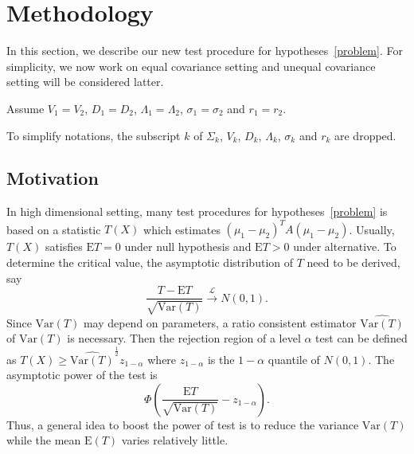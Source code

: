 
\section{Methodology}

In this section, we describe our new test procedure for hypotheses~\eqref{problem}. For simplicity, we now work on equal covariance setting and unequal covariance setting will be considered latter.
\begin{assumption}\label{theModel2}
Assume $V_1=V_2$, $D_1=D_2$, $\Lambda_1=\Lambda_2$, $\sigma_1=\sigma_2$ and $r_1=r_2$.
\end{assumption}

To simplify notations, the subscript $k$ of $\Sigma_k$, $V_k$, $D_k$, $\Lambda_k$, $\sigma_k$ and $r_k$ are dropped.

\subsection{Motivation}
 In high dimensional setting, many test procedures for hypotheses~\eqref{problem} is based on a statistic $T(X)$ which estimates ${(\mu_1-\mu_2)}^T A(\mu_1-\mu_2)$.
 Usually, $T(X)$ satisfies $\mathrm{E}T=0$ under null hypothesis and $\mathrm{E}T> 0$  under alternative.
 To determine the critical value, the asymptotic distribution of $T$ need to be derived, say 
 $$\frac{T-\textrm{E}T}{\sqrt{\textrm{Var}(T)}}\xrightarrow{\mathcal{L}} N(0,1).$$
 Since $\textrm{Var}(T)$ may depend on parameters, a ratio consistent estimator $\widehat{\textrm{Var}(T)}$ of $\textrm{Var}(T)$ is necessary. Then
 the rejection region of a level $\alpha$ test can be defined as $T(X)\geq \widehat{\textrm{Var}(T)}^{\frac{1}{2}}z_{1-\alpha}$ where $z_{1-\alpha}$ is the $1-\alpha$ quantile of $N(0,1)$. 
The asymptotic power of the test is 
$$\Phi(\frac{\mathrm{E}T}{\sqrt{\mathrm{Var}(T)}}-z_{1-\alpha}).$$
Thus, a general idea to boost the power of test is to reduce the variance $\mathrm{Var}(T)$ while the mean $\mathrm{E}(T)$ varies relatively little.

